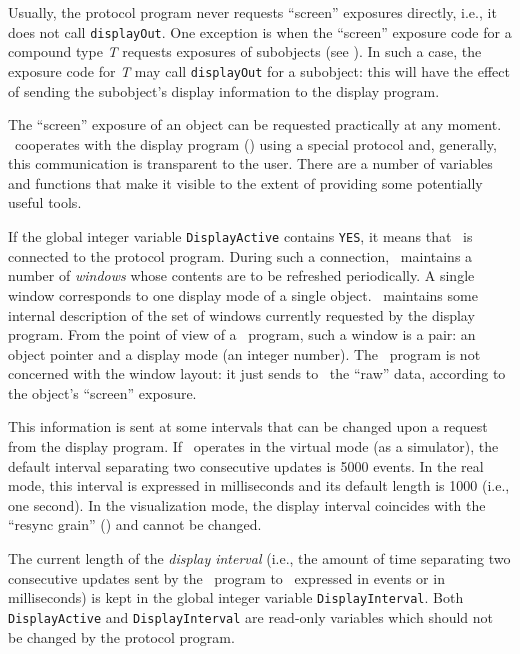 Usually, the protocol program never requests ``screen'' exposures directly,
i.e., it does not call {\tt displayOut}.
One exception is when the ``screen'' exposure code for a compound type {\em T\/}
requests exposures of subobjects (see ).
In such a case, the exposure code for {\em T\/} may call {\tt displayOut} for
a subobject: this will have the effect of sending
the subobject's display information to the display program.

The ``screen'' exposure of an object can be requested practically
at any moment.
\smurph\ cooperates with the display program (\dsd)
using a special protocol
and, generally, this communication is transparent to the user.
There are a number of variables and functions that make it visible
to the extent of providing some potentially useful tools.

If the global integer variable {\tt DisplayActive} contains {\tt YES},
it means that \dsd\ is connected to the protocol program.
During such a connection, \dsd\ maintains a number
of {\em windows\/} whose contents are to be refreshed periodically.
A single window corresponds to one display mode of a single object.
\smurph\ maintains some internal description of the set of windows
currently requested by the display program.
From the point of view of a \smurph\ program, such a window is a pair:
an object pointer and a display mode (an integer number).
The \smurph\ program is not concerned with the window layout: it just sends to
\dsd\ the ``raw'' data, according to the object's ``screen'' exposure.

This information is sent at some intervals that can be changed upon a
request from the display program.
If \smurph\ operates in the virtual mode (as a simulator), the default
interval separating two consecutive updates is 5000 events.
In the real mode, this interval is expressed in milliseconds and its default
length is 1000 (i.e., one second).
In the visualization mode, the display interval coincides with the
``resync grain'' () and cannot be changed.

The current length of the {\em display interval\/}
(i.e., the amount of time separating
two consecutive updates sent by the \smurph\ program to \dsd\ expressed
in events or in milliseconds)
is kept in the global integer variable {\tt DisplayInterval}.
Both {\tt DisplayActive} and {\tt DisplayInterval} are read-only variables
which should not be changed by the protocol program.


